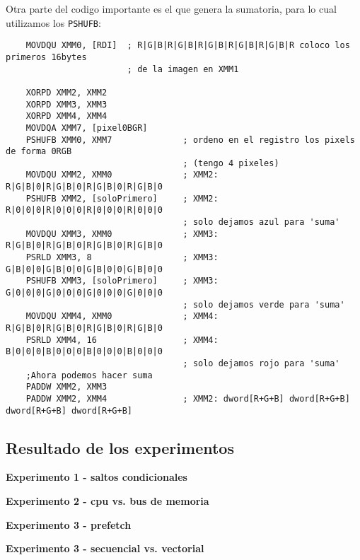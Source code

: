 Otra parte del codigo importante es el que genera la sumatoria, para lo cual utilizamos los \verb|PSHUFB|:\\
\begin{codesnippet}
\begin{verbatim}
	MOVDQU XMM0, [RDI]	; R|G|B|R|G|B|R|G|B|R|G|B|R|G|B|R coloco los primeros 16bytes 
                        ; de la imagen en XMM1

    XORPD XMM2, XMM2
    XORPD XMM3, XMM3
    XORPD XMM4, XMM4
    MOVDQA XMM7, [pixel0BGR]
    PSHUFB XMM0, XMM7              ; ordeno en el registro los pixels de forma 0RGB 
                                   ; (tengo 4 pixeles)
    MOVDQU XMM2, XMM0              ; XMM2: R|G|B|0|R|G|B|0|R|G|B|0|R|G|B|0
    PSHUFB XMM2, [soloPrimero]     ; XMM2: R|0|0|0|R|0|0|0|R|0|0|0|R|0|0|0
                                   ; solo dejamos azul para 'suma'
    MOVDQU XMM3, XMM0              ; XMM3: R|G|B|0|R|G|B|0|R|G|B|0|R|G|B|0 	
    PSRLD XMM3, 8                  ; XMM3: G|B|0|0|G|B|0|0|G|B|0|0|G|B|0|0		
    PSHUFB XMM3, [soloPrimero]     ; XMM3: G|0|0|0|G|0|0|0|G|0|0|0|G|0|0|0
                                   ; solo dejamos verde para 'suma'
    MOVDQU XMM4, XMM0              ; XMM4: R|G|B|0|R|G|B|0|R|G|B|0|R|G|B|0 	
    PSRLD XMM4, 16                 ; XMM4: B|0|0|0|B|0|0|0|B|0|0|0|B|0|0|0
                                   ; solo dejamos rojo para 'suma'
    ;Ahora podemos hacer suma
    PADDW XMM2, XMM3
    PADDW XMM2, XMM4               ; XMM2: dword[R+G+B] dword[R+G+B] dword[R+G+B] dword[R+G+B]
\end{verbatim}
\end{codesnippet}

\subsection{Resultado de los experimentos}
\vspace*{0.3cm} \noindent
\textbf{Experimento 1 - saltos condicionales}

\vspace*{0.3cm} \noindent
\textbf{Experimento 2 - cpu vs. bus de memoria}

\vspace*{0.3cm} \noindent
\textbf{Experimento 3 - prefetch}

\vspace*{0.3cm} \noindent
\textbf{Experimento 3 - secuencial vs. vectorial}
